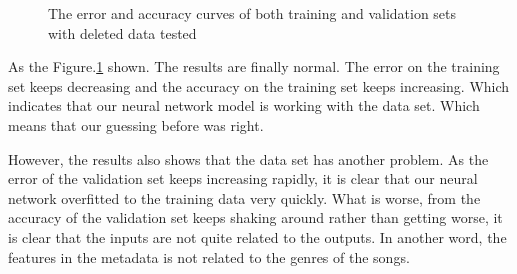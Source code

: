 \documentclass{article}
\begin{document}
\begin{figure}[h]%
\centering
{}%
%
\qquad
{}%
%
\qquad
\caption{The error and accuracy curves of both training and validation sets with deleted data tested}
\label{fig:deleteddata}
\end{figure}

As the Figure.\ref{fig:deleteddata} shown. The results are finally normal. The error on the training set keeps decreasing and the accuracy on the training set keeps increasing. Which indicates that our neural network model is working with the data set. Which means that our guessing before was right.

However, the results also shows that the data set has another problem. As the error of the validation set keeps increasing rapidly, it is clear that our neural network overfitted to the training data very quickly. What is worse, from the accuracy of the validation set keeps shaking around rather than getting worse, it is clear that the inputs are not quite related to the outputs. In another word, the features in the metadata is not related to the genres of the songs.
\end{document}
